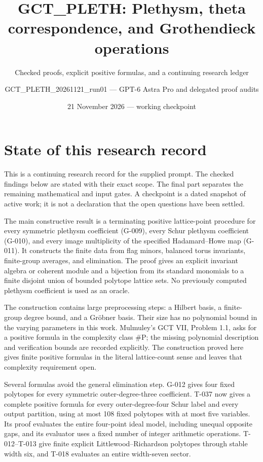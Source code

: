 \documentclass[
  10pt,
]{article}
\title{GCT\_PLETH: Plethysm, theta correspondence, and Grothendieck
operations}
\subtitle{Checked proofs, explicit positive formulas, and a continuing
research ledger}
\author{GCT\_PLETH\_20261121\_run01 --- GPT-6 Astra Pro and delegated
proof audits}
\date{21 November 2026 --- working checkpoint}
\begin{document}
\maketitle

{
\hypersetup{linkcolor=}
\setcounter{tocdepth}{3}
\tableofcontents
}
\section{State of this research
record}\label{state-of-this-research-record}

This is a continuing research record for the supplied prompt. The
checked findings below are stated with their exact scope. The final part
separates the remaining mathematical and input gates. A checkpoint is a
dated snapshot of active work; it is not a declaration that the open
questions have been settled.

The main constructive result is a terminating positive lattice-point
procedure for every symmetric plethysm coefficient (G-009), every Schur
plethysm coefficient (G-010), and every image multiplicity of the
specified Hadamard--Howe map (G-011). It constructs the finite data from
flag minors, balanced torus invariants, finite-group averages, and
elimination. The proof gives an explicit invariant algebra or coherent
module and a bijection from its standard monomials to a finite disjoint
union of bounded polytope lattice sets. No previously computed plethysm
coefficient is used as an oracle.

The construction contains large preprocessing steps: a Hilbert basis, a
finite-group degree bound, and a Gröbner basis. Their size has no
polynomial bound in the varying parameters in this work. Mulmuley's GCT
VII, Problem 1.1, asks for a positive formula in the complexity class
\#P; the missing polynomial description and verification bounds are
recorded explicitly. The construction proved here gives finite positive
formulas in the literal lattice-count sense and leaves that complexity
requirement open.

Several formulas avoid the general elimination step. G-012 gives four
fixed polytopes for every symmetric outer-degree-three coefficient.
T-037 now gives a complete positive formula for every outer-degree-four
Schur label and every output partition, using at most 108 fixed
polytopes with at most five variables. Its proof evaluates the entire
four-point ideal model, including unequal opposite gaps, and its
evaluator uses a fixed number of integer arithmetic operations.
T-012--T-013 give finite explicit Littlewood--Richardson polytopes
through stable width six, and T-018 evaluates an entire width-seven
sector.
\end{document}
